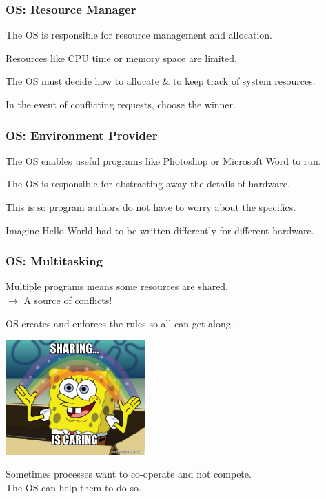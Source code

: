 \begin{frame}
\frametitle{OS: Resource Manager}

The OS is responsible for resource management and allocation.

Resources like CPU time or memory space are limited.

The OS must decide how to allocate \& to keep track of system resources.

In the event of conflicting requests, choose the winner.


\end{frame}

\begin{frame}
\frametitle{OS: Environment Provider}

The OS enables useful programs like Photoshop or Microsoft Word to run. 

The OS is responsible for abstracting away the details of hardware.

This is so program authors do not have to worry about the specifics.

Imagine Hello World had to be written differently for different hardware.


\end{frame}

\begin{frame}
\frametitle{OS: Multitasking}
Multiple programs means some resources are shared.\\
\quad $\rightarrow$ A source of conflicts!

OS creates and enforces the rules so all can get along.

\begin{center}
	\includegraphics[width=0.4\textwidth]{images/sharing-is-caring.jpg}
\end{center}

Sometimes processes want to co-operate and not compete.\\
\quad The OS can help them to do so.


\end{frame}

